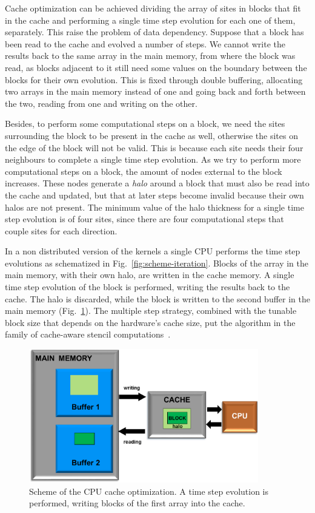Cache optimization can be achieved dividing the array of sites in blocks that fit in the cache and performing a single time step evolution for each one of them, separately. This raise the problem of data dependency. Suppose that a block has been read to the cache and evolved a number of steps. We cannot write the results back to the same array in the main memory, from where the block was read, as blocks adjacent to it still need some values on the boundary between the blocks for their own evolution. This is fixed through double buffering, allocating two arrays in the main memory instead of one and going back and forth between the two, reading from one and writing on the other.

Besides, to perform some computational steps on a block, we need the sites surrounding the block to be present in the cache as well, otherwise the sites on the edge of the block will not be valid. This is because each site needs their four neighbours to complete a single time step evolution. As we try to perform more computational steps on a block, the amount of nodes external to the block increases. These nodes generate a \textit{halo} around a block that must also be read into the cache and updated, but that at later steps become invalid because their own halos are not present. The minimum value of the halo thickness for a single time step evolution is of four sites, since there are four computational steps that couple sites for each direction.

In a non distributed version of the kernels a single CPU performs the time step evolutions as schematized in Fig.~\ref{fig:scheme-iteration}. Blocks of the array in the main memory, with their own halo, are written in the cache memory. A single time step evolution of the block is performed, writing the results back to the cache. The halo is discarded, while the block is written to the second buffer in the main memory (Fig.~\ref{fig:CPU-cache-optimization}). The multiple step strategy, combined with the tunable block size that depends on the hardware's cache size, put the algorithm in the family of cache-aware stencil computations~\cite{kamil2006implicit}.
\begin{figure}
   \centering
   \includegraphics[width=10cm]{Figs/CPU-cache_optimization.png}
   \caption{Scheme of the CPU cache optimization. A time step evolution is performed, writing blocks of the first array into the cache.} \label{fig:CPU-cache-optimization}
\end{figure}

